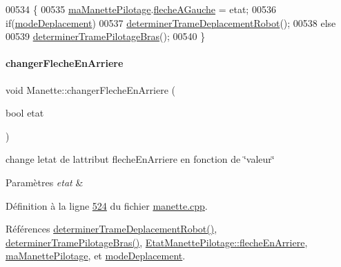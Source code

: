 \begin{DoxyCode}
00534 \{
00535     \hyperlink{class_manette_aeb3e02eaeaec4c656f78ed8fc6dae342}{maManettePilotage}.\hyperlink{struct_etat_manette_pilotage_aace02b9bb3feb3b618dd9133d4c5b87f}{flecheAGauche} = etat;
00536     \textcolor{keywordflow}{if}(\hyperlink{class_manette_a4dc6231c8cc65fac03f59d323fa9a038}{modeDeplacement})
00537         \hyperlink{class_manette_a97a50caac68954a229c7e9461e7f4232}{determinerTrameDeplacementRobot}();
00538     \textcolor{keywordflow}{else}
00539         \hyperlink{class_manette_ab5eb6972f366aa7527b2b27da5539638}{determinerTramePilotageBras}();
00540 \}
\end{DoxyCode}
\mbox{\label{class_manette_a6e83727ee7bf7b3276b86d08b1c8d4d5}} 
\paragraph{\texorpdfstring{changer\+Fleche\+En\+Arriere}{changerFlecheEnArriere}}
{\footnotesize\ttfamily void Manette\+::changer\+Fleche\+En\+Arriere (\begin{DoxyParamCaption}\item[{bool}]{etat }\end{DoxyParamCaption})\hspace{0.3cm}{\ttfamily [slot]}}



change l\textquotesingle{}etat de l\textquotesingle{}attribut fleche\+En\+Arriere en fonction de \char`\"{}valeur\char`\"{} 


\begin{DoxyParams}{Paramètres}
{\em etat} & \\
\hline
\end{DoxyParams}


Définition à la ligne \hyperlink{manette_8cpp_source_l00524}{524} du fichier \hyperlink{manette_8cpp_source}{manette.\+cpp}.



Références \hyperlink{manette_8cpp_source_l00341}{determiner\+Trame\+Deplacement\+Robot()}, \hyperlink{manette_8cpp_source_l00375}{determiner\+Trame\+Pilotage\+Bras()}, \hyperlink{manette_8h_source_l00153}{Etat\+Manette\+Pilotage\+::fleche\+En\+Arriere}, \hyperlink{manette_8h_source_l00246}{ma\+Manette\+Pilotage}, et \hyperlink{manette_8h_source_l00253}{mode\+Deplacement}.


